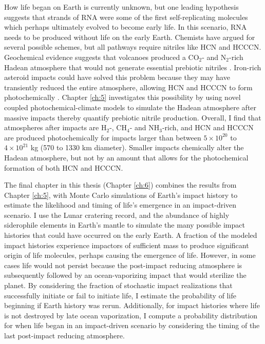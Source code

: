 How life began on Earth is currently unknown, but one leading hypothesis suggests that strands of RNA were some of the first self-replicating molecules which perhaps ultimately evolved to become early life. In this scenario, RNA needs to be produced without life on the early Earth. Chemists have argued for several possible schemes, but all pathways require nitriles like HCN and HCCCN. Geochemical evidence suggests that volcanoes produced a CO$_2$- and N$_2$-rich Hadean atmosphere that would not generate essential prebiotic nitriles \citep{Holland_1984}. Iron-rich asteroid impacts could have solved this problem because they may have transiently reduced the entire atmosphere, allowing HCN and HCCCN to form photochemically \citep{Zahnle_2020}. Chapter \ref{ch:5} investigates this possibility by using novel coupled photochemical-climate models to simulate the Hadean atmosphere after massive impacts thereby quantify prebiotic nitrile production. Overall, I find that atmospheres after impacts are H$_2$-, CH$_4$- and NH$_3$-rich, and HCN and HCCCN are produced photochemically for impacts larger than between $5 \times 10^{20}$ to $4 \times 10^{21}$ kg (570 to 1330 km diameter). Smaller impacts chemically alter the Hadean atmosphere, but not by an amount that allows for the photochemical formation of both HCN and HCCCN. 

The final chapter in this thesis (Chapter \ref{ch:6}) combines the results from Chapter \ref{ch:5}, with Monte Carlo simulations of Earth's impact history to estimate the likelihood and timing of life's emergence in an impact-driven scenario. I use the Lunar cratering record, and the abundance of highly siderophile elements in Earth's mantle to simulate the many possible impact histories that could have occurred on the early Earth. A fraction of the modeled impact histories experience impactors of sufficient mass to produce significant origin of life molecules, perhaps causing the emergence of life. However, in some cases life would not persist because the post-impact reducing atmosphere is subsequently followed by an ocean-vaporizing impact that would sterilize the planet. By considering the fraction of stochastic impact realizations that successfully initiate or fail to initiate life, I estimate the probability of life beginning if Earth history was rerun. Additionally, for impact histories where life is not destroyed by late ocean vaporization, I compute a probability distribution for when life began in an impact-driven scenario by considering the timing of the last post-impact reducing atmosphere.
